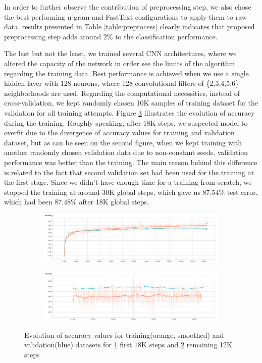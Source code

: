 In order to further observe the contribution of preprocessing step, we also chose the best-performing n-gram and FastText configurations to apply them to raw data.
results presented in Table \ref{table:preprocess} clearly indicates that proposed preprocessing step adds around $2\%$ to the classification performance.



The last but not the least, we trained several CNN architectures, where we altered the capacity of the network in order see the limits of the algorithm regarding the training data.
Best performance is achieved when we use a single hidden layer with 128 neurons, where 128 convolutional filters of \{2,3,4,5,6\} neighborhoods are used.
Regarding the computational necessities, instead of cross-validation, we kept randomly chosen 10K samples of training dataset for the validation for all training attempts.
Figure \ref{fig:cnn_train} illustrates the evolution of accuracy during the training.
Roughly speaking, after 18K steps, we suspected model to overfit due to the divergence of accuracy values for training and validation dataset, but as can be seen on the second figure, when we kept training with another randomly chosen validation data due to non-constant seeds, validation performance was better than the training.
The main reason behind this difference is related to the fact that second validation set had been used for the training at the first stage.
Since we didn't have enough time for a training from scratch, we stopped the training at around 30K global steps, which gave us $87.54\%$ test error, which had been $87.48\%$ after 18K global steps.

\begin{figure}[h!]
	\centering
	\begin{subfigure}{\columnwidth}
		\centering
		\includegraphics[width=\linewidth]{accuracy1.png}
		\caption{}
		\label{fig:18k}
	\end{subfigure}
	\begin{subfigure}{\columnwidth}
		\centering
		\includegraphics[width=\linewidth]{accuracy2.png}
		\caption{}
		\label{fig:30k}
	\end{subfigure}
	\caption{Evolution of accuracy values for training(orange, smoothed) and validation(blue) datasets for \ref{fig:18k} first 18K steps and \ref{fig:30k} remaining 12K steps}
	\label{fig:cnn_train}
\end{figure}

